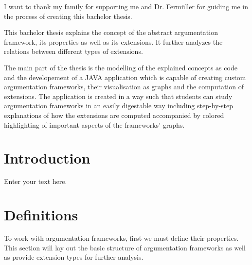 \documentclass[draft,final]{vutinfth} %
\newcommand{\hl}{\par\medskip}
\begin{document}
\frontmatter %

\addstatementpage

\begin{acknowledgements*}
I want to thank my family for supporting me and Dr. Ferm{\"u}ller for guiding me in the process of creating this bachelor thesis.
\end{acknowledgements*}

\begin{abstract*}
This bachelor thesis explains the concept of the abstract argumentation framework, its properties as well as its extensions. It further analyzes the relations between different types of extensions.\hl
The main part of the thesis is the modelling of the explained concepts as code and the developement of a JAVA application which is capable of creating custom argumentation frameworks, their visualisation as graphs and the computation of extensions. The application is created in a way such that students can study argumentation frameworks in an easily digestable way including step-by-step explanations of how the extensions are computed accompanied by colored highlighting of important aspects of the frameworks' graphs.\\ %
\end{abstract*}


\tableofcontents* %

\mainmatter

\chapter{Introduction}
Enter your text here.

\chapter{Definitions}

To work with argumentation frameworks, first we must define their properties. This section will lay out the basic structure of argumentation frameworks as well as provide extension types for further analysis.\hl
\end{document}

